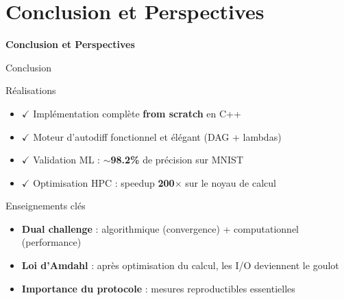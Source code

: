 \documentclass[aspectratio=169,xcolor=dvipsnames]{beamer}
\begin{document}
\section{Conclusion et Perspectives}
\begin{frame}
    \centering
    \Huge \textbf{Conclusion et Perspectives}
\end{frame}



\begin{frame}{Conclusion}
\begin{block}{Réalisations}
\begin{itemize}
    \item $\checkmark$ Implémentation complète \textbf{from scratch} en C++
    \item $\checkmark$ Moteur d'autodiff fonctionnel et élégant (DAG + lambdas)
    \item $\checkmark$ Validation ML : \textbf{$\sim$98.2\%} de précision sur MNIST
    \item $\checkmark$ Optimisation HPC : speedup \textbf{200$\times$} sur le noyau de calcul
\end{itemize}
\end{block}

\vspace{0.3cm}

\begin{alertblock}{Enseignements clés}
\begin{itemize}
    \item \textbf{Dual challenge} : algorithmique (convergence) + computationnel (performance)
    \item \textbf{Loi d'Amdahl} : après optimisation du calcul, les I/O deviennent le goulot
    \item \textbf{Importance du protocole} : mesures reproductibles essentielles
\end{itemize}
\end{alertblock}
\end{frame}
\end{document}
